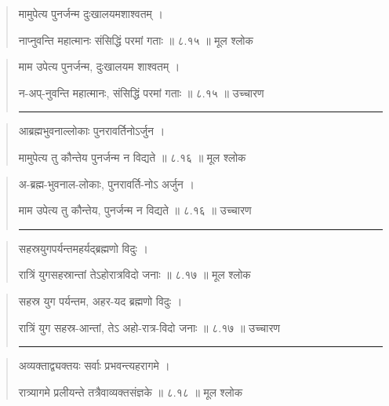 \begin{quotation} 

मामुपेत्य पुनर्जन्म दुःखालयमशाश्वतम्‌  ।  

नाप्नुवन्ति महात्मानः संसिद्धिं परमां गताः  ॥ ८.१५ ॥  मूल श्लोक
\end{quotation}

\begin{quotation}


माम उपेत्य पुनर्जन्म, दुःखालयम शाश्वतम्‌  ।  

न-अप्-नुवन्ति महात्मानः, संसिद्धिं परमां गताः  ॥ ८.१५ ॥  उच्चारण

\noindent\rule{16cm}{0.4pt} 
\end{quotation}


\begin{quotation} 

आब्रह्मभुवनाल्लोकाः पुनरावर्तिनोऽर्जुन  ।  

मामुपेत्य तु कौन्तेय पुनर्जन्म न विद्यते  ॥ ८.१६ ॥  मूल श्लोक
\end{quotation}

\begin{quotation}

अ-ब्रह्म-भुवनाल-लोकाः, पुनरावर्ति-नोऽ अर्जुन  ।  

माम उपेत्य तु कौन्तेय, पुनर्जन्म न विद्यते  ॥ ८.१६ ॥  उच्चारण

\noindent\rule{16cm}{0.4pt} 
\end{quotation}


\begin{quotation} 

सहस्रयुगपर्यन्तमहर्यद्ब्रह्मणो विदुः  ।  

रात्रिं युगसहस्रान्तां तेऽहोरात्रविदो जनाः  ॥ ८.१७ ॥  मूल श्लोक
\end{quotation}

\begin{quotation}

सहस्र युग पर्यन्तम, अहर-यद ब्रह्मणो विदुः  ।  

रात्रिं युग सहस्र-आन्तां, तेऽ अहो-रात्र-विदो जनाः  ॥ ८.१७ ॥  उच्चारण

\noindent\rule{16cm}{0.4pt} 
\end{quotation}


\begin{quotation} 

अव्यक्ताद्व्यक्तयः सर्वाः प्रभवन्त्यहरागमे  ।  

रात्र्यागमे प्रलीयन्ते तत्रैवाव्यक्तसंज्ञके  ॥ ८.१८ ॥  मूल श्लोक
\end{quotation}

